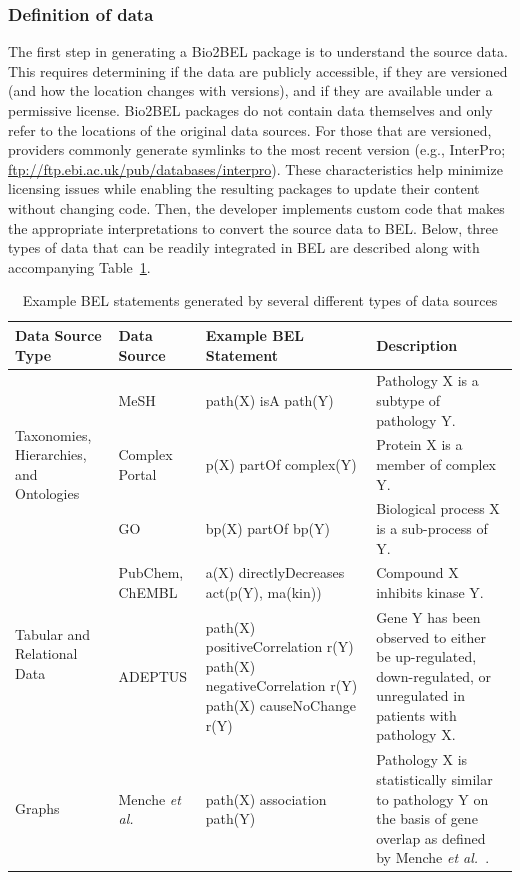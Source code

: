 \subsubsection*{Definition of data}

The first step in generating a Bio2BEL package is to understand the source data.
This requires determining if the data are publicly accessible, if they are versioned (and how the location changes with versions), and if they are available under a permissive license.
Bio2BEL packages do not contain data themselves and only refer to the locations of the original data sources.
For those that are versioned, providers commonly generate symlinks to the most recent version (e.g., InterPro; \url{ftp://ftp.ebi.ac.uk/pub/databases/interpro}).
These characteristics help minimize licensing issues while enabling the resulting packages to update their content without changing code.
Then, the developer implements custom code that makes the appropriate interpretations to convert the source data to BEL.
Below, three types of data that can be readily integrated in BEL are described along with accompanying Table~\ref{tab:statements}.

\begin{table}[h!]
\caption{Example BEL statements generated by several different types of data sources}
\label{tab:statements}
\begin{tabular}{llll}
\hline
  Data Source Type
  & Data Source            & Example BEL Statement                     & Description \\
\hline
\multirow{3}{*}{Taxonomies, Hierarchies, and Ontologies}
  & MeSH                   & path(X) isA path(Y)                       & Pathology X is a subtype of pathology Y. \\
  & Complex Portal         & p(X) partOf complex(Y)                    & Protein X is a member of complex Y. \\
  & GO                     & bp(X) partOf bp(Y)                        & Biological process X is a sub-process of Y. \\
\hline
\multirow{2}{*}{Tabular and Relational Data}
  & PubChem, ChEMBL        & a(X) directlyDecreases act(p(Y), ma(kin)) & Compound X inhibits kinase Y. \\
  & ADEPTUS                & path(X) positiveCorrelation r(Y)\newline
path(X) negativeCorrelation r(Y)\newline
path(X) causeNoChange r(Y)
& Gene Y has been observed to either be up-regulated, down-regulated, or unregulated in patients with pathology X. \\
\hline
Graphs
  & Menche \textit{et al.} & path(X) association path(Y)               & Pathology X is statistically similar to pathology Y on the basis of gene overlap as defined by Menche \textit{et al.}~\cite{Menche2015}. \\
\end{tabular}
\end{table}

